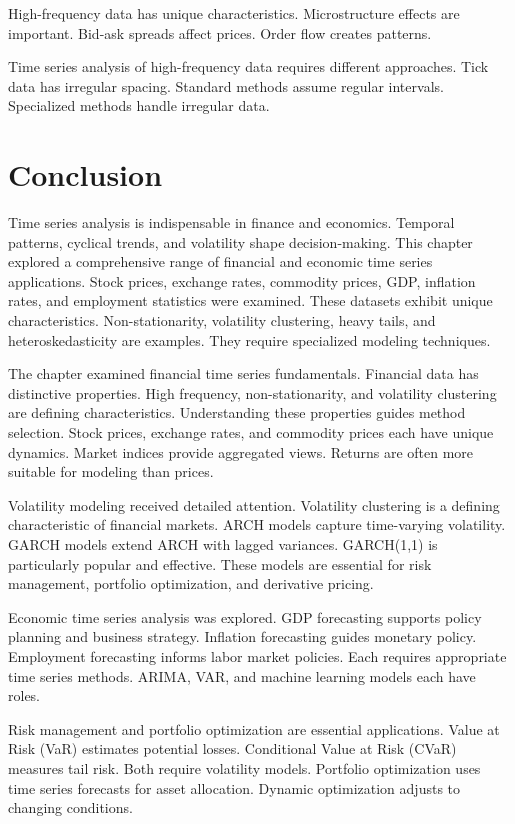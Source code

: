 High-frequency data has unique characteristics. Microstructure effects are important. Bid-ask spreads affect prices. Order flow creates patterns.

Time series analysis of high-frequency data requires different approaches. Tick data has irregular spacing. Standard methods assume regular intervals. Specialized methods handle irregular data.



\section{Conclusion}

Time series analysis is indispensable in finance and economics. Temporal patterns, cyclical trends, and volatility shape decision-making. This chapter explored a comprehensive range of financial and economic time series applications. Stock prices, exchange rates, commodity prices, GDP, inflation rates, and employment statistics were examined. These datasets exhibit unique characteristics. Non-stationarity, volatility clustering, heavy tails, and heteroskedasticity are examples. They require specialized modeling techniques.

The chapter examined financial time series fundamentals. Financial data has distinctive properties. High frequency, non-stationarity, and volatility clustering are defining characteristics. Understanding these properties guides method selection. Stock prices, exchange rates, and commodity prices each have unique dynamics. Market indices provide aggregated views. Returns are often more suitable for modeling than prices.

Volatility modeling received detailed attention. Volatility clustering is a defining characteristic of financial markets. ARCH models capture time-varying volatility. GARCH models extend ARCH with lagged variances. GARCH(1,1) is particularly popular and effective. These models are essential for risk management, portfolio optimization, and derivative pricing.

Economic time series analysis was explored. GDP forecasting supports policy planning and business strategy. Inflation forecasting guides monetary policy. Employment forecasting informs labor market policies. Each requires appropriate time series methods. ARIMA, VAR, and machine learning models each have roles.

Risk management and portfolio optimization are essential applications. Value at Risk (VaR) estimates potential losses. Conditional Value at Risk (CVaR) measures tail risk. Both require volatility models. Portfolio optimization uses time series forecasts for asset allocation. Dynamic optimization adjusts to changing conditions.

